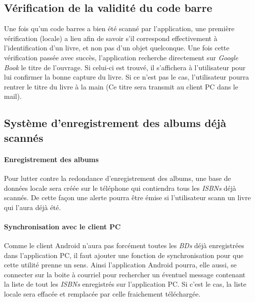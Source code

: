 \subsection{Vérification de la validité du code barre}
Une fois qu'un code barres a bien été scanné par l'application, 
	 une première vérification (locale) a lieu afin de savoir s'il correspond effectivement à l'identification d'un livre, et non pas d'un objet quelconque. 
Une fois cette vérification passée avec succès, l'application recherche directement sur \emph{Google Book} le titre de l'ouvrage. Si celui-ci est trouvé, il s'affichera à l'utilisateur pour lui confirmer la bonne capture du livre. 
Si ce n'est pas le cas, l'utilisateur pourra rentrer le titre du livre à la main (Ce titre sera transmit au client PC dans le mail). 

\subsection{Système d'enregistrement des albums déjà scannés}

\paragraph{Enregistrement des albums}
Pour lutter contre la redondance d'enregistrement des albums, une base de données locale sera créée sur le téléphone qui contiendra tous les \emph{ISBNs} déjà scannés. 
De cette façon une alerte pourra être émise si l'utilisateur scann un livre qui l'aura déjà été. 

\paragraph{Synchronisation avec le client PC}
Comme le client Android n'aura pas forcément toutes les \emph{BDs} déjà enregistrées dans l'application PC, 
il faut ajouter une fonction de synchronisation pour que cette utilité prenne un sens.
Ainsi l'application Android pourra, elle aussi, se connecter sur la boite à courriel pour rechercher un éventuel message contenant la liste de tout les \emph{ISBNs} enregistrés sur l'application PC. 
Si c'est le cas, la liste locale sera effacée et remplacée par celle fraichement téléchargée.
